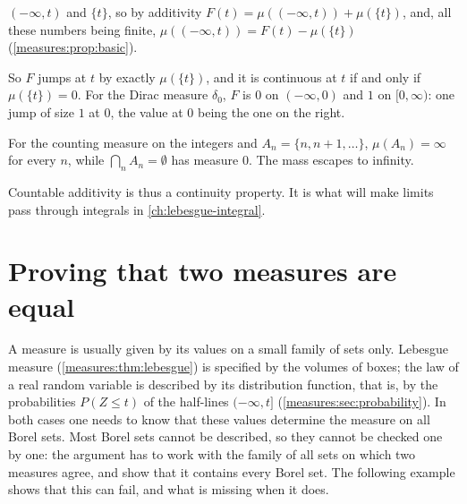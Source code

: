 \begin{notechapter}
\begin{example}
\begin{enumerate}[nosep]
\begin{itemize}[nosep]
                $(-\infty, t)$ and $\{t\}$, so by additivity
                $F(t) = \mu((-\infty, t)) + \mu(\{t\})$, and, all these
                numbers being finite,
                $\mu((-\infty, t)) = F(t) - \mu(\{t\})$
                (\cref{measures:prop:basic}).
        \end{itemize}
        So $F$ jumps at $t$ by exactly $\mu(\{t\})$, and it is
        continuous at $t$ if and only if $\mu(\{t\}) = 0$. For the Dirac
        measure $\delta_0$, $F$ is $0$ on $(-\infty, 0)$ and $1$ on
        $[0, \infty)$: one jump of size $1$ at $0$, the value at $0$
        being the one on the right.
\end{enumerate}
\end{example}

\begin{pitfall}
For the counting measure on the integers and $A_n = \{n, n + 1, \dots\}$,
$\mu(A_n) = \infty$ for every $n$, while $\bigcap_nA_n = \emptyset$ has
measure $0$. The mass escapes to infinity.
\end{pitfall}

Countable additivity is thus a continuity property. It is what will make
limits pass through integrals in \cref{ch:lebesgue-integral}.

\section{Proving that two measures are equal}\label{measures:sec:pilambda}

A measure is usually given by its values on a small family of sets only.
Lebesgue measure (\cref{measures:thm:lebesgue}) is specified by the
volumes of boxes; the law of a real random variable is described by its
distribution function, that is, by the probabilities $P(Z\leq t)$ of the
half-lines $(-\infty, t]$ (\cref{measures:sec:probability}). In both
cases one needs to know that these values determine the measure on all
Borel sets. Most Borel sets cannot be described, so they cannot be
checked one by one: the argument has to work with the family of all
sets on which two measures agree, and show that it contains every Borel
set. The following example shows that this can fail, and what is
missing when it does.


\end{notechapter}
